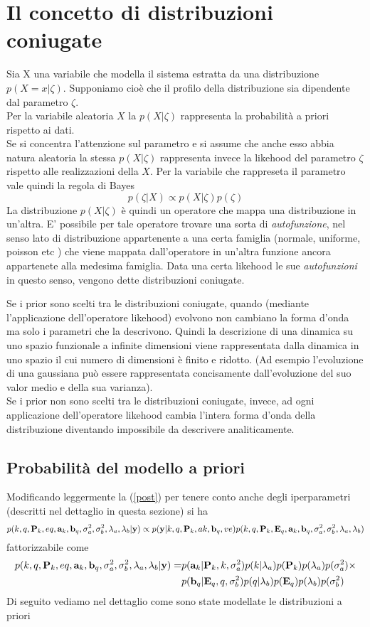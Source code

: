 \section{Il concetto di distribuzioni coniugate}
Sia X una variabile che modella il sistema estratta da una distribuzione $p(X=x|\zeta)$.
Supponiamo cioè che il profilo della distribuzione sia dipendente dal parametro $\zeta$.\\
Per la variabile aleatoria $X$ la $p(X|\zeta)$ rappresenta la probabilità a priori rispetto ai dati.\\
Se si concentra l'attenzione sul parametro e si assume che anche esso abbia natura aleatoria la stessa $p(X|\zeta)$ rappresenta invece la likehood  del parametro $\zeta$ rispetto alle realizzazioni della $X$. 
Per la variabile che rappreseta il parametro vale quindi la regola di Bayes
\begin{equation}
p(\zeta|X)\propto p(X|\zeta)p(\zeta)
\end{equation}
La distribuzione $p(X|\zeta)$ è quindi un operatore che mappa una distribuzione in un'altra. E’ possibile per tale operatore trovare una sorta di \emph{autofunzione}, nel senso
 lato di distribuzione appartenente a una certa famiglia (normale, uniforme, poisson etc ) che viene mappata dall’operatore in un’altra funzione ancora appartenete
alla medesima famiglia.
Data una certa likehood le sue \emph{autofunzioni} in questo senso, vengono dette distribuzioni coniugate.

Se i prior sono scelti tra le distribuzioni coniugate, quando (mediante l’applicazione
dell’operatore likehood) evolvono non cambiano la forma d’onda ma solo i parametri
che la descrivono. Quindi la descrizione di una dinamica su uno spazio funzionale a
infinite dimensioni viene rappresentata dalla dinamica in uno spazio il cui numero di
dimensioni è finito e ridotto. (Ad esempio l’evoluzione di una gaussiana può essere
rappresentata concisamente dall’evoluzione del suo valor medio e della sua varianza).\\
Se  i prior non sono scelti tra le distribuzioni coniugate, invece, ad ogni applicazione
dell’operatore likehood cambia l’intera forma d’onda della distribuzione diventando
impossibile da descrivere analiticamente.
\subsection{Probabilità del modello a priori}
Modificando leggermente la (\ref{post}) per tenere conto anche degli iperparametri (descritti nel dettaglio in questa sezione) si ha
\begin{equation}
p(k,q,\textbf{P}_k,eq,\textbf{a}_k,\textbf{b}_q,\sigma_a^2,\sigma_b^2,\lambda_a,\lambda_b|\textbf{y})\propto
p(\textbf{y}|k,q,\textbf{P}_k,ak,\textbf{b}_q,ve)
p(k,q,\textbf{P}_k,\textbf{E}_q,\textbf{a}_k,\textbf{b}_q,\sigma_a^2,\sigma_b^2,\lambda_a,\lambda_b)
\end{equation}
fattorizzabile come
\begin{align}
p(k,q,\textbf{P}_k,eq,\textbf{a}_k,\textbf{b}_q,\sigma_a^2,\sigma_b^2,\lambda_a,\lambda_b|\textbf{y})= & p(\textbf{a}_k|\textbf{P}_k,k,\sigma_a^2)p(k|\lambda_a)p(\textbf{P}_k)p(\lambda_a)p(\sigma_a^2)\times \nonumber\\
& p(\textbf{b}_q|\textbf{E}_q,q,\sigma_b^2)p(q|\lambda_b)p(\textbf{E}_q)p(\lambda_b)p(\sigma_b^2)
\end{align}
Di seguito vediamo nel dettaglio come sono state modellate le distribuzioni a priori
